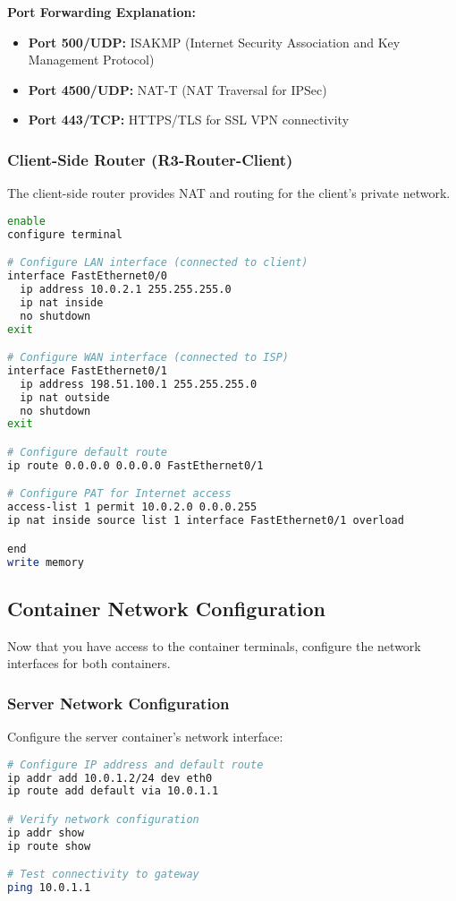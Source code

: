 \noindent
\textbf{Port Forwarding Explanation:}
\begin{itemize}
    \item \textbf{Port 500/UDP:} ISAKMP (Internet Security Association and Key Management Protocol)
    \item \textbf{Port 4500/UDP:} NAT-T (NAT Traversal for IPSec)
    \item \textbf{Port 443/TCP:} HTTPS/TLS for SSL VPN connectivity
\end{itemize}

\subsubsection{Client-Side Router (R3-Router-Client)}

The client-side router provides NAT and routing for the client's private network.

\begin{lstlisting}[language=bash]
enable
configure terminal

# Configure LAN interface (connected to client)
interface FastEthernet0/0
  ip address 10.0.2.1 255.255.255.0
  ip nat inside
  no shutdown
exit

# Configure WAN interface (connected to ISP)
interface FastEthernet0/1
  ip address 198.51.100.1 255.255.255.0
  ip nat outside
  no shutdown
exit

# Configure default route
ip route 0.0.0.0 0.0.0.0 FastEthernet0/1

# Configure PAT for Internet access
access-list 1 permit 10.0.2.0 0.0.0.255
ip nat inside source list 1 interface FastEthernet0/1 overload

end
write memory
\end{lstlisting}

\subsection{Container Network Configuration}

Now that you have access to the container terminals, configure the network interfaces for both containers.

\subsubsection{Server Network Configuration}

Configure the server container's network interface:

\begin{lstlisting}[language=bash]
# Configure IP address and default route
ip addr add 10.0.1.2/24 dev eth0
ip route add default via 10.0.1.1

# Verify network configuration
ip addr show
ip route show

# Test connectivity to gateway
ping 10.0.1.1
\end{lstlisting}

